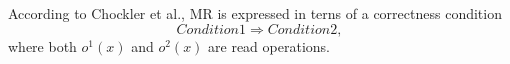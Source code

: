 \documentclass[journal,compsoc]{IEEEtran}
\begin{document}
 \par  According to Chockler et al.,
 MR is expressed in terns of a correctness condition \begin{equation}\label{eqn:formdef}
Condition 1 \Rightarrow Condition 2, \end{equation} %
 where both $\mathit{o}^1(x)$ and $\mathit{o}^2(x)$ are read operations.
\end{document}
